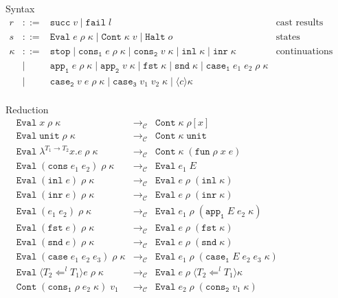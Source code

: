 \documentclass[acmsmall,review,anonymous]{acmart}\settopmatter{printfolios=true,printccs=false,printacmref=false}
\newcommand{\stxrule}[3]{#1 & ::= & #3 & \text{#2}\\}
\newcommand{\stxrulecont}[1]{& | & #1 & \\}
\newcommand{\sOOinspect}[3]{\mathtt{Eval} \; #1 \; #2 \; #3}
\newcommand{\sOOreturn}[2]{\mathtt{Cont} \; #2 \; #1}
\newcommand{\sOOhalt}[1]{\mathtt{Halt} \; #1}
\newcommand{\eOOvar}[1]{#1}
\newcommand{\eOOsole}[0]{\mathtt{unit}}
\newcommand{\eOOlam}[4]{\lambda^{#1\rightarrow{}#2}#3.#4}
\newcommand{\eOOapp}[2]{#1 \; #2}
\newcommand{\eOOcons}[2]{\mathtt{cons} \; #1 \; #2}
\newcommand{\eOOcar}[1]{\mathtt{fst} \; #1}
\newcommand{\eOOcdr}[1]{\mathtt{snd} \; #1}
\newcommand{\eOOinl}[1]{\mathtt{inl} \; #1}
\newcommand{\eOOinr}[1]{\mathtt{inr} \; #1}
\newcommand{\eOOcase}[3]{\mathtt{case} \; #1 \; #2 \; #3}
\newcommand{\eOOcast}[4]{\langle \cOOcast{#2}{#3}{#4} \rangle #1}
\newcommand{\cOOcast}[3]{#3 \Leftarrow^{#2} #1}
\newcommand{\vOOfun}[3]{\mathtt{fun} \; #1 \; #2 \; #3}
\newcommand{\vOOtt}[0]{\mathtt{unit}}
\newcommand{\rOOsucc}[1]{\mathtt{succ}\;#1}
\newcommand{\rOOfail}[1]{\mathtt{fail}\;#1}
\newcommand{\kOOmt}[0]{\mathtt{stop}}
\newcommand{\kOOconsI}[3]{\mathtt{cons_1} \; #1 \; #2 \; #3}
\newcommand{\kOOconsII}[2]{\mathtt{cons_2} \; #1 \; #2}
\newcommand{\kOOinl}[1]{\mathtt{inl} \; #1}
\newcommand{\kOOinr}[1]{\mathtt{inr} \; #1}
\newcommand{\kOOappI}[3]{
	\mathtt{app_1} \; #1 \; #2 \; #3
}
\newcommand{\kOOappII}[2]{
	\mathtt{app_2} \; #1 \; #2}
\newcommand{\kOOcar}[1]{
	\mathtt{fst} \; #1}
\newcommand{\kOOcdr}[1]{
	\mathtt{snd} \; #1}
\newcommand{\kOOcaseI}[4]{
	\mathtt{case_1} \; #1 \; #2 \; #3 \; #4}
\newcommand{\kOOcaseII}[4]{
	\mathtt{case_2} \; #1 \; #2 \; #3 \; #4}
\newcommand{\kOOcaseIII}[3]{
	\mathtt{case_3} \; #1 \; #2 \; #3}
\newcommand{\kOOcast}[2]{
	\langle #1 \rangle #2}
\newcommand{\judgeCreduce}[2]{#1 \longrightarrow_{\mathcal{C}} #2}
\newcommand{\redrule}[3]{#1 & \longrightarrow_\mathcal{C} & #2 & #3\\}
\begin{document}
\begin{figure}
	
	Syntax
	\[
	\begin{array}{rclr}
	\stxrule{r}{cast results}{
		\rOOsucc{v} \mid
		\rOOfail{l}
	}
	\stxrule{s}{states}{
		\sOOinspect{e}{\rho}{\kappa} \mid{}
		\sOOreturn{v}{\kappa} \mid{}
		\sOOhalt{o}
	}
	
	\stxrule{\kappa}{continuations}{
		\kOOmt \mid
		\kOOconsI{e}{\rho}{\kappa} \mid
		\kOOconsII{v}{\kappa} \mid
		\kOOinl{\kappa} \mid
		\kOOinr{\kappa}
	}
	\stxrulecont{
		\kOOappI{e}{\rho}{\kappa} \mid
		\kOOappII{v}{\kappa} \mid
		\kOOcar{\kappa} \mid
		\kOOcdr{\kappa} \mid
		\kOOcaseI{e_1}{e_2}{\rho}{\kappa}
	}
	\stxrulecont{	
		\kOOcaseII{v}{e}{\rho}{\kappa} \mid
		\kOOcaseIII{v_1}{v_2}{\kappa} \mid
		\kOOcast{c}{\kappa}
	}
	\end{array}
	\]
	
	Reduction \fbox{$ \judgeCreduce{s}{s} $}
	\[
	\begin{array}{rclr}
	\redrule{
		\sOOinspect{\eOOvar{x}}{\rho}{\kappa}
	}{	
		\sOOreturn{\rho[x]}{\kappa}
	}{}
	\redrule{
		\sOOinspect{\eOOsole}{\rho}{\kappa}
	}{
		\sOOreturn{\vOOtt}{\kappa}
	}{}
	\redrule{
		\sOOinspect{\eOOlam{T_1}{T_2}{x}{e}}{\rho}{\kappa}
	}{
		\sOOreturn{(\vOOfun{\rho}{x}{e})}{\kappa}
	}{}
	\redrule{
		\sOOinspect{(\eOOcons{e_1}{e_2})}{\rho}{\kappa}
	}{
		\sOOinspect{e_1}{E}{}
	}{}
	\redrule{
		\sOOinspect{(\eOOinl{e})}{\rho}{\kappa}
	}{
		\sOOinspect{e}{\rho}{(\kOOinl{\kappa})}
	}{}
	\redrule{
	\sOOinspect{(\eOOinr{e})}{\rho}{\kappa}
	}{
	\sOOinspect{e}{\rho}{(\kOOinr{\kappa})}
	}{}
	\redrule{
		\sOOinspect{(\eOOapp{e_1}{e_2})}{\rho}{\kappa}
	}{
\sOOinspect{e_1}{\rho}{(\kOOappI{E}{e_2}{\kappa})}}{}
\redrule{
\sOOinspect{(\eOOcar{e})}{\rho}{\kappa}}{
\sOOinspect{e}{\rho}{(\kOOcar{\kappa})}}{}
\redrule{
	\sOOinspect{(\eOOcdr{e})}{\rho}{\kappa}}{
	\sOOinspect{e}{\rho}{(\kOOcdr{\kappa})}}{}
\redrule{
\sOOinspect{(\eOOcase{e_1}{e_2}{e_3})}{\rho}{\kappa}}{
\sOOinspect{e_1}{\rho}{(\kOOcaseI{E}{e_2}{e_3}{\kappa})}}{}
	\redrule{
		\sOOinspect{\eOOcast{e}{T_1}{l}{T_2}}{\rho}{\kappa}
	}{
		\sOOinspect{e}{\rho}{\langle\cOOcast{T_1}{l}{T_2}\rangle\kappa}
	}{}

\redrule{
\sOOreturn{v_1}{(\kOOconsI{\rho}{e_2}{\kappa})}}{
\sOOinspect{e_2}{\rho}{(\kOOconsII{v_1}{\kappa})}}{}


\end{array}\]
\end{figure}
\end{document}
